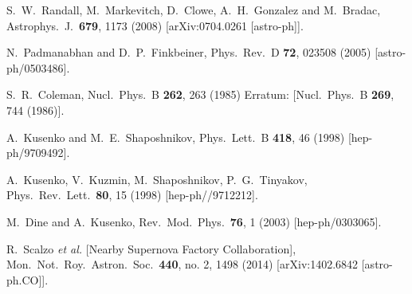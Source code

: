   S.~W.~Randall, M.~Markevitch, D.~Clowe, A.~H.~Gonzalez and M.~Bradac,
  Astrophys.\ J.\  {\bf 679}, 1173 (2008)
  [arXiv:0704.0261 [astro-ph]].


  N.~Padmanabhan and D.~P.~Finkbeiner,
  Phys.\ Rev.\ D {\bf 72}, 023508 (2005)
  [astro-ph/0503486].


  S.~R.~Coleman,
  Nucl.\ Phys.\ B {\bf 262}, 263 (1985)
  Erratum: [Nucl.\ Phys.\ B {\bf 269}, 744 (1986)].


  A.~Kusenko and M.~E.~Shaposhnikov,
  Phys.\ Lett.\ B {\bf 418}, 46 (1998)
  [hep-ph/9709492].


  A.~Kusenko, V.~Kuzmin, M.~Shaposhnikov, P.~G.~Tinyakov,
  Phys.\ Rev.\ Lett.\ {\bf 80}, 15 (1998)
  [hep-ph//9712212].


  M.~Dine and A.~Kusenko,
  Rev.\ Mod.\ Phys.\  {\bf 76}, 1 (2003)
  [hep-ph/0303065].


  R.~Scalzo {\it et al.} [Nearby Supernova Factory Collaboration],
  Mon.\ Not.\ Roy.\ Astron.\ Soc.\  {\bf 440}, no. 2, 1498 (2014)
  [arXiv:1402.6842 [astro-ph.CO]].


